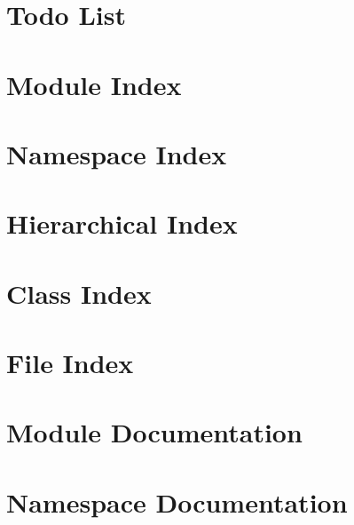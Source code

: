 \documentclass[twoside]{book}
\newcommand{\+}{\discretionary{\mbox{\scriptsize$\hookleftarrow$}}{}{}}
\begin{document}
\chapter{Todo List}
\label{todo}

\chapter{Module Index}

\chapter{Namespace Index}

\chapter{Hierarchical Index}

\chapter{Class Index}

\chapter{File Index}

\chapter{Module Documentation}






\chapter{Namespace Documentation}



\end{document}
